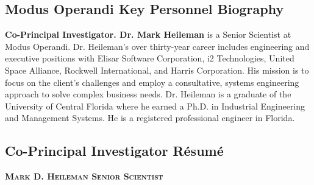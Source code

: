 \documentclass{sbir}
\begin{document}
\vspace{-6pt}
\subsection{Modus Operandi Key Personnel Biography}\label{MDH}
{\bfseries Co-Principal Investigator. Dr. Mark Heileman} is a Senior Scientist at Modus Operandi. Dr. Heileman's over thirty-year career includes engineering and executive positions with Elisar Software Corporation, i2 Technologies, United Space Alliance, Rockwell International, and Harris Corporation. His mission is to focus on the client's challenges and employ a consultative, systems engineering approach to solve complex business needs. Dr. Heileman is a graduate of the University of Central Florida where he earned a Ph.D. in Industrial Engineering and Management Systems. He is a registered professional engineer in Florida.

\subsection{Co-Principal Investigator R\'esum\'e}
\textbf{\textsc{Mark D. Heileman \hfill Senior Scientist}}
\end{document}
